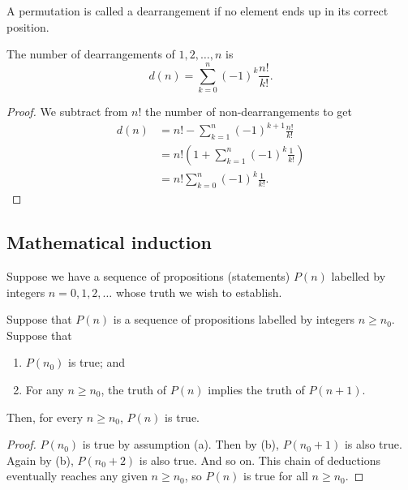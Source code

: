 \documentclass[10pt, a4paper]{article}
\begin{document}
\begin{definition}
    A permutation is called a dearrangement if no element ends up in its correct position.
\end{definition}

\begin{proposition}
    The number of dearrangements of $1, 2, \dotsc, n$ is
    \[
    d(n) = \sum_{k = 0}^{n}(-1) ^ k\frac{n!}{k!}.
    \]
    \begin{proof}
        We subtract from $n!$ the number of non-dearrangements to get
        \begin{align*}
            d(n) &= n! - \sum_{k = 1}^{n}(-1) ^ {k + 1}\frac{n!}{k!} \\
            &= n!\left(1 + \sum_{k = 1}^n(-1) ^ k\frac{1}{k!}\right) \\
            &= n!\sum_{k = 0}^n(-1) ^ k\frac{1}{k!}.
        \end{align*}
    \end{proof}
\end{proposition}

\subsection{Mathematical induction}
Suppose we have a sequence of propositions (statements) $P(n)$ labelled by integers $n = 0, 1, 2, \dotsc$ whose truth we wish to establish.

\begin{theorem}
    Suppose that $P(n)$ is a sequence of propositions labelled by integers $n \geq n_0$.
    Suppose that
    \begin{enumerate}[label = (\alph*)]
        \item $P(n_0)$ is true; and
        \item For any $n \geq n_0$,
        the truth of $P(n)$ implies the truth of $P(n + 1)$.
    \end{enumerate}
    Then,
    for every $n \geq n_0$,
    $P(n)$ is true.
    \begin{proof}
        $P(n_0)$ is true by assumption (a).
        Then by (b),
        $P(n_0 + 1)$ is also true.
        Again by (b),
        $P(n_0 + 2)$ is also true.
        And so on.
        This chain of deductions eventually reaches any given $n \geq n_0$,
        so $P(n)$ is true for all $n \geq n_0$.
    \end{proof}
\end{theorem}
\end{document}
